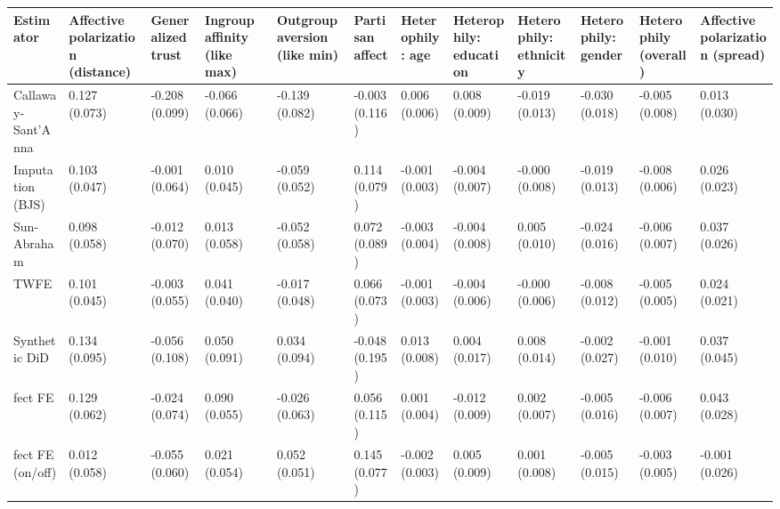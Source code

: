 
\begin{tabular}{llllllllllll}
\toprule
Estimator & Affective polarization (distance) & Generalized trust & Ingroup affinity (like max) & Outgroup aversion (like min) & Partisan affect & Heterophily: age & Heterophily: education & Heterophily: ethnicity & Heterophily: gender & Heterophily (overall) & Affective polarization (spread)\\
\midrule
Callaway-Sant'Anna & 0.127 (0.073) & -0.208 (0.099) & -0.066 (0.066) & -0.139 (0.082) & -0.003 (0.116) & 0.006 (0.006) & 0.008 (0.009) & -0.019 (0.013) & -0.030 (0.018) & -0.005 (0.008) & 0.013 (0.030)\\
Imputation (BJS) & 0.103 (0.047) & -0.001 (0.064) & 0.010 (0.045) & -0.059 (0.052) & 0.114 (0.079) & -0.001 (0.003) & -0.004 (0.007) & -0.000 (0.008) & -0.019 (0.013) & -0.008 (0.006) & 0.026 (0.023)\\
Sun-Abraham & 0.098 (0.058) & -0.012 (0.070) & 0.013 (0.058) & -0.052 (0.058) & 0.072 (0.089) & -0.003 (0.004) & -0.004 (0.008) & 0.005 (0.010) & -0.024 (0.016) & -0.006 (0.007) & 0.037 (0.026)\\
TWFE & 0.101 (0.045) & -0.003 (0.055) & 0.041 (0.040) & -0.017 (0.048) & 0.066 (0.073) & -0.001 (0.003) & -0.004 (0.006) & -0.000 (0.006) & -0.008 (0.012) & -0.005 (0.005) & 0.024 (0.021)\\
Synthetic DiD & 0.134 (0.095) & -0.056 (0.108) & 0.050 (0.091) & 0.034 (0.094) & -0.048 (0.195) & 0.013 (0.008) & 0.004 (0.017) & 0.008 (0.014) & -0.002 (0.027) & -0.001 (0.010) & 0.037 (0.045)\\
fect FE & 0.129 (0.062) & -0.024 (0.074) & 0.090 (0.055) & -0.026 (0.063) & 0.056 (0.115) & 0.001 (0.004) & -0.012 (0.009) & 0.002 (0.007) & -0.005 (0.016) & -0.006 (0.007) & 0.043 (0.028)\\
fect FE (on/off) & 0.012 (0.058) & -0.055 (0.060) & 0.021 (0.054) & 0.052 (0.051) & 0.145 (0.077) & -0.002 (0.003) & 0.005 (0.009) & 0.001 (0.008) & -0.005 (0.015) & -0.003 (0.005) & -0.001 (0.026)\\
\bottomrule
\end{tabular}

